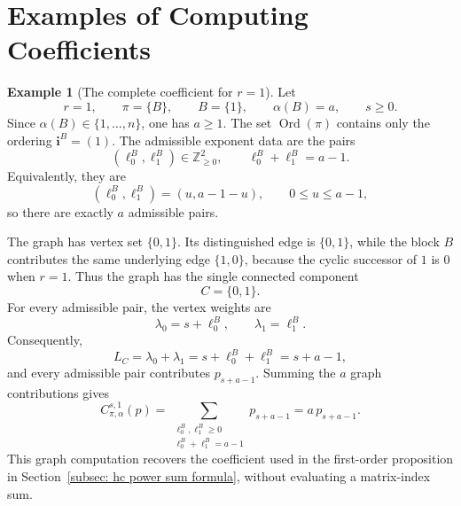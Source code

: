 \documentclass[11pt,reqno]{amsart}
\theoremstyle{definition}
\newtheorem{example}[theorem]{Example}
\newcommand{\bbZ}{\mathbb{Z}}
\newcommand{\Ord}{\operatorname{Ord}}
\newcommand{\bfi}{\mathbf{i}}
\begin{document}
\section{Examples of Computing Coefficients}\label{sect:examples}




\begin{example}[The complete coefficient for \texorpdfstring{\(r=1\)}{r=1}]
	Let
\[
   r=1,\qquad
   \pi=\{B\},\qquad
   B=\{1\},\qquad
   \alpha(B)=a,\qquad
   s\geq0.
\]
Since \(\alpha(B)\in\{1,\ldots,n\}\), one has \(a\geq1\).
The set \(\Ord(\pi)\) contains only the ordering
\(\bfi^B=(1)\).  The admissible exponent data are the pairs
\[
   (\ell_0^B,\ell_1^B)\in\bbZ_{\geq0}^2,
   \qquad
   \ell_0^B+\ell_1^B=a-1.
\]
Equivalently, they are
\[
   (\ell_0^B,\ell_1^B)=(u,a-1-u),
   \qquad 0\leq u\leq a-1,
\]
so there are exactly \(a\) admissible pairs.

The graph has vertex set \(\{0,1\}\).  Its distinguished edge is
\(\{0,1\}\), while the block \(B\) contributes the same underlying edge
\(\{1,0\}\), because the cyclic successor of \(1\) is \(0\) when \(r=1\).
Thus the graph has the single connected component
\[
   C=\{0,1\}.
\]
For every admissible pair, the vertex weights are
\[
   \lambda_0=s+\ell_0^B,
   \qquad
   \lambda_1=\ell_1^B.
\]
Consequently,
\[
   L_C
   =\lambda_0+\lambda_1
   =s+\ell_0^B+\ell_1^B
   =s+a-1,
\]
and every admissible pair contributes \(p_{s+a-1}\).  Summing the \(a\)
graph contributions gives
\[
   C_{\pi,\alpha}^{s,1}(p)
   =
   \sum_{\substack{\ell_0^B,\ell_1^B\geq0\\
                   \ell_0^B+\ell_1^B=a-1}}
   p_{s+a-1}
   =
   a\,p_{s+a-1}.
\]
This graph computation recovers the coefficient used in the first-order
proposition in Section~\ref{subsec: hc power sum formula}, without
evaluating a matrix-index sum.
\end{example}
\end{document}
